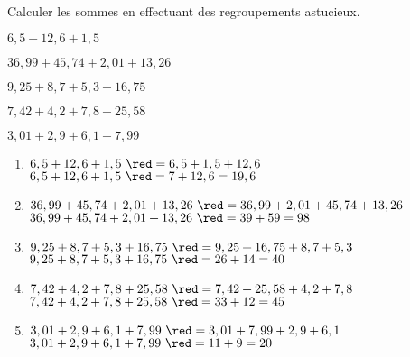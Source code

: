 \begin{exercice}
    Calculer les sommes en effectuant des regroupements astucieux.    
    \begin{enumerate}
        \begin{spacing}{1.5}
            \item $6,5+12,6+1,5$
            \item $36,99+45,74+2,01+13,26$
            \item $9,25+8,7+5,3+16,75$
            \item $7,42+4,2+7,8+25,58$
            \item $3,01+2,9+6,1+7,99$
        \end{spacing}
    \end{enumerate}      
 \end{exercice}
 \begin{corrige}
    \begin{enumerate}
        \item $6,5+12,6+1,5             ~{\red = 6,5 + 1,5 + 12,6}$
        $6,5+12,6+1,5             ~{\red = 7 + 12,6 = 19,6}$
        \item $36,99+45,74+2,01+13,26   ~{\red = 36,99 + 2,01 + 45,74 + 13,26}$
        $36,99+45,74+2,01+13,26   ~{\red = 39 + 59 = 98}$
        \item $9,25+8,7+5,3+16,75       ~{\red = 9,25 + 16,75 + 8,7 + 5,3}$
        $9,25+8,7+5,3+16,75       ~{\red = 26 + 14 = 40}$
        \item $7,42+4,2+7,8+25,58       ~{\red = 7,42 + 25,58 + 4,2 + 7,8}$
        $7,42+4,2+7,8+25,58       ~{\red = 33 + 12 = 45}$
        \item $3,01+2,9+6,1+7,99        ~{\red = 3,01+7,99+2,9+6,1}$
        $3,01+2,9+6,1+7,99        ~{\red = 11+9=20}$
    \end{enumerate}
 \end{corrige}